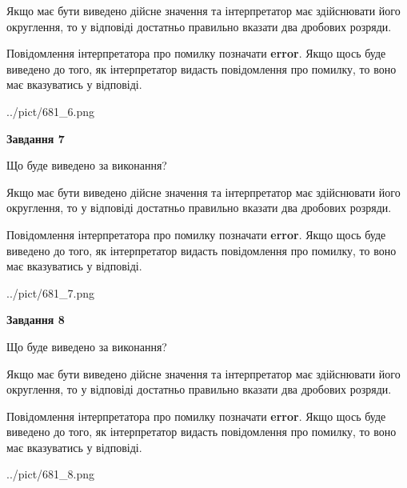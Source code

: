 \documentclass[12pt, ukrainian]{article}
\begin{document}
{\begin {Large}
Якщо має бути виведено дійсне значення та інтерпретатор має здійснювати його округлення, 
то у відповіді достатньо правильно вказати два дробових розряди.

Повідомлення інтерпретатора про помилку позначати \textbf{error}.
Якщо щось буде виведено до того, як інтерпретатор видасть повідомлення про помилку, 
то воно має вказуватись у відповіді. \par

\begin{center}
	{../pict/681_6.png}
\end{center}
\newpage

{\begin {center}\textbf{Завдання 7}\end {center}}\par
Що буде виведено за виконання? \par

Якщо має бути виведено дійсне значення та інтерпретатор має здійснювати його округлення, 
то у відповіді достатньо правильно вказати два дробових розряди.

Повідомлення інтерпретатора про помилку позначати \textbf{error}.
Якщо щось буде виведено до того, як інтерпретатор видасть повідомлення про помилку, 
то воно має вказуватись у відповіді. \par

\begin{center}
	{../pict/681_7.png}
\end{center}
\newpage

{\begin {center}\textbf{Завдання 8}\end {center}}\par
Що буде виведено за виконання? \par

Якщо має бути виведено дійсне значення та інтерпретатор має здійснювати його округлення, 
то у відповіді достатньо правильно вказати два дробових розряди.

Повідомлення інтерпретатора про помилку позначати \textbf{error}.
Якщо щось буде виведено до того, як інтерпретатор видасть повідомлення про помилку, 
то воно має вказуватись у відповіді. \par

\begin{center}
	{../pict/681_8.png}
\end{center}
\newpage


\end{Large}}
\end{document}

